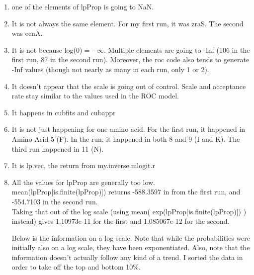 \begin{enumerate}
\item one of the elements of lpProp is going to NaN.
\item It is not always the same element. For my first run, it was zraS. The second was ecnA.
\item It is not because log(0)$= -\infty$. Multiple elements are going to -Inf (106 in the first run,  87 in the second run). Moreover, the roc code also tends to generate -Inf values (though not nearly as many in each run, only 1 or 2).
\item It doesn't appear that the scale is going out of control. Scale and acceptance rate stay similar to the values used in the ROC model.
\item It happens in cubfits and cubappr 
\item It is not just happening for one amino acid. For the first run, it happened in Amino Acid 5 (F). In the run, it happened in both 8 and 9 (I and K). The third run happened in 11 (N).
\item It is lp.vec, the return from my.inverse.mlogit.r

\item All the values for lpProp are generally too low.\\
mean(lpProp[is.finite(lpProp)]) returns -588.3597 in from the first run, and -554.7103 in the second run.\\

Taking that out of the log scale (using mean( exp(lpProp[is.finite(lpProp)]) ) instead) gives 1.10973e-11 for the first and 1.085067e-12 for the second.



Below is the information on a log scale. Note that while the probabilities were initially also on a log scale, they have been exponentiated. Also, note that the information doesn't actually follow any kind of a trend. I sorted the data in order to take off the top and bottom 10\%.


\end{enumerate}
